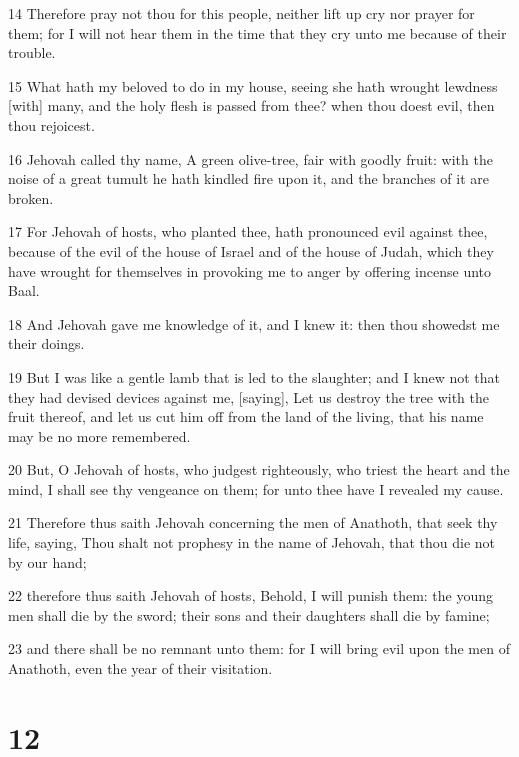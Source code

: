 \par 14 Therefore pray not thou for this people, neither lift up cry nor prayer for them; for I will not hear them in the time that they cry unto me because of their trouble.
\par 15 What hath my beloved to do in my house, seeing she hath wrought lewdness [with] many, and the holy flesh is passed from thee? when thou doest evil, then thou rejoicest.
\par 16 Jehovah called thy name, A green olive-tree, fair with goodly fruit: with the noise of a great tumult he hath kindled fire upon it, and the branches of it are broken.
\par 17 For Jehovah of hosts, who planted thee, hath pronounced evil against thee, because of the evil of the house of Israel and of the house of Judah, which they have wrought for themselves in provoking me to anger by offering incense unto Baal.
\par 18 And Jehovah gave me knowledge of it, and I knew it: then thou showedst me their doings.
\par 19 But I was like a gentle lamb that is led to the slaughter; and I knew not that they had devised devices against me, [saying], Let us destroy the tree with the fruit thereof, and let us cut him off from the land of the living, that his name may be no more remembered.
\par 20 But, O Jehovah of hosts, who judgest righteously, who triest the heart and the mind, I shall see thy vengeance on them; for unto thee have I revealed my cause.
\par 21 Therefore thus saith Jehovah concerning the men of Anathoth, that seek thy life, saying, Thou shalt not prophesy in the name of Jehovah, that thou die not by our hand;
\par 22 therefore thus saith Jehovah of hosts, Behold, I will punish them: the young men shall die by the sword; their sons and their daughters shall die by famine;
\par 23 and there shall be no remnant unto them: for I will bring evil upon the men of Anathoth, even the year of their visitation.

\chapter{12}

